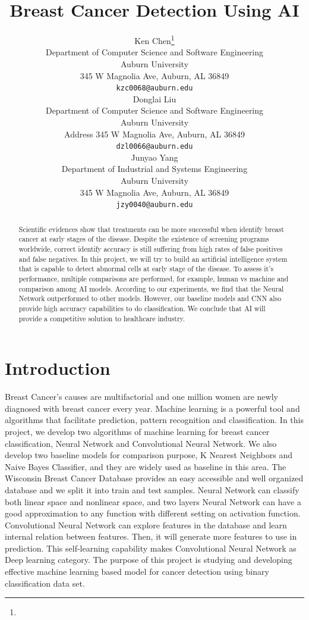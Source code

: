\documentclass{article} %
\title{Breast Cancer Detection Using AI}
\author{
Ken Chen\thanks{} \\
Department of Computer Science and Software Engineering\\
Auburn University\\
345 W Magnolia Ave, Auburn, AL 36849 \\
\texttt{kzc0068@auburn.edu} \\
\And
Donglai Liu \\
Department of Computer Science and Software Engineering \\
Auburn University\\
Address 345 W Magnolia Ave, Auburn, AL 36849\\
\texttt{dzl0066@auburn.edu} \\
\AND
Junyao Yang \\
Department of Industrial and Systems Engineering \\
Auburn University\\
345 W Magnolia Ave, Auburn, AL 36849 \\
\texttt{jzy0040@auburn.edu} \\
}
\begin{document}
\maketitle

\begin{abstract}
Scientific evidences show that treatments can be more successful when identify breast cancer at early stages of the disease. Despite the existence of screening programs worldwide, correct identify accuracy is still suffering from high rates of false positives and false negatives. In this project, we will try to build an artificial intelligence system that is capable to detect abnormal cells at early stage of the disease. To assess it's performance, multiple comparisons are performed, for example, human vs machine and comparison among AI models. According to our experiments, we find that the Neural Network outperformed to other models. However, our baseline models and CNN also provide high accuracy capabilities to do classification. We conclude that AI will provide a competitive solution to healthcare industry. 
\end{abstract}

\section{Introduction}
Breast Cancer's causes are multifactorial and one million women are newly diagnosed with breast cancer every year. Machine learning is a powerful tool and algorithms that facilitate prediction, pattern recognition and classification. In this project, we develop two algorithms of machine learning for breast cancer classification, Neural Network and Convolutional Neural Network. We also develop two baseline models for comparison purpose, K Nearest Neighbors and Naive Bayes Classifier, and they are widely used  as baseline in this area. The Wisconsin Breast Cancer Database provides an easy accessible and well organized database and we split it into train and test samples. Neural Network can classify both linear space and nonlinear space, and two layers Neural Network can have a good approximation to any function with different setting on activation function. Convolutional Neural Network can explore features in the database and learn internal relation between features. Then, it will generate more features to use in prediction. This self-learning capability makes Convolutional Neural Network as Deep learning category. The purpose of this project is studying and developing effective machine learning based model for cancer detection using binary classification data set. 
\end{document}
